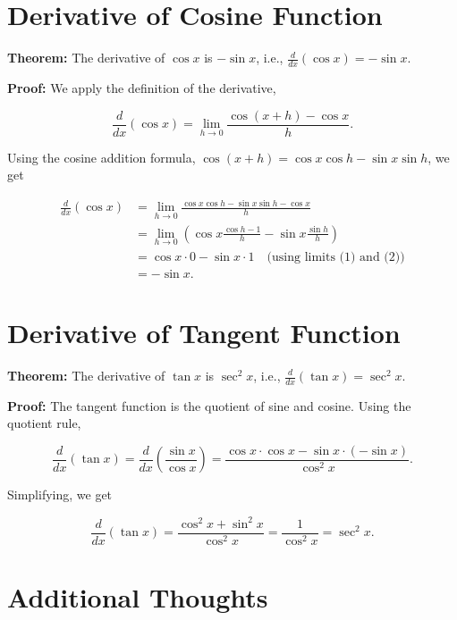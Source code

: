\documentclass[a4paper,12pt]{book}
\begin{document}
\section*{Derivative of Cosine Function}

\textbf{Theorem:} The derivative of $\cos x$ is $-\sin x$, i.e., $\frac{d}{dx}(\cos x) = -\sin x$.

\textbf{Proof:} We apply the definition of the derivative,

\begin{equation}
    \frac{d}{dx}(\cos x) = \lim_{h \to 0} \frac{\cos(x+h) - \cos x}{h}.
\end{equation}

Using the cosine addition formula, $\cos(x+h) = \cos x \cos h - \sin x \sin h$, we get

\begin{align*}
    \frac{d}{dx}(\cos x) &= \lim_{h \to 0} \frac{\cos x \cos h - \sin x \sin h - \cos x}{h} \\
                         &= \lim_{h \to 0} \left(\cos x \frac{\cos h - 1}{h} - \sin x \frac{\sin h}{h}\right) \\
                         &= \cos x \cdot 0 - \sin x \cdot 1 \quad \text{(using limits (1) and (2))} \\
                         &= -\sin x.
\end{align*}

\section*{Derivative of Tangent Function}

\textbf{Theorem:} The derivative of $\tan x$ is $\sec^2 x$, i.e., $\frac{d}{dx}(\tan x) = \sec^2 x$.

\textbf{Proof:} The tangent function is the quotient of sine and cosine. Using the quotient rule,

\begin{equation}
    \frac{d}{dx}(\tan x) = \frac{d}{dx}\left(\frac{\sin x}{\cos x}\right) = \frac{\cos x \cdot \cos x - \sin x \cdot (-\sin x)}{\cos^2 x}.
\end{equation}

Simplifying, we get

\begin{equation}
    \frac{d}{dx}(\tan x) = \frac{\cos^2 x + \sin^2 x}{\cos^2 x} = \frac{1}{\cos^2 x} = \sec^2 x.
\end{equation}

\section*{Additional Thoughts}
\end{document}
